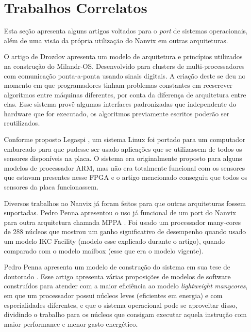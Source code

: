 \section{Trabalhos Correlatos}

Esta seção apresenta alguns artigos voltados para o \textit{port} de sistemas operacionais, além de uma visão da própria utilização do Nanvix em outras arquiteturas.

O artigo de Drozdov \cite{Drozdov2015RealTimeOS} apresenta um modelo de arquitetura e princípios utilizados na construção
do Milandr-OS. Desenvolvido para clusters de multi-processadores com comunicação ponta-a-ponta usando sinais digitais. A criação deste se deu no momento em
que programadores tinham problemas constantes em reescrever algoritmos entre máquinas diferentes, por conta da diferença de arquitetura entre elas. Esse sistema
provê algumas interfaces padronizadas que independente do hardware que for executado, os algoritmos previamente escritos poderão ser reutilizados.

Conforme proposto Legaspi \cite{7372829}, um sistema Linux foi portado para um computador embarcado para
que pudesse ser usado aplicações que se utilizassem de todos os sensores disponíveis na placa. O sistema era originalmente proposto para alguns modelos de processador ARM, mas não era totalmente funcional com os sensores que estavam presentes nesse FPGA e o artigo mencionado conseguiu que todos os sensores da placa funcionassem.

Diversos trabalhos no Nanvix já foram feitos para que outras arquiteturas fossem suportadas. Pedro Penna apresentou o uso já funcional de um port do 
Nanvix para outra arquitetura chamada MPPA \cite{PENNA20211}. Foi usado um processador many-cores de 288 núcleos que mostrou um ganho significativo de desempenho quando usado um 
modelo IKC Facility (modelo esse explicado durante o artigo), quando comparado com o modelo mailbox (esse que era o modelo vigente).

Pedro Penna apresenta um modelo de construção do sistema em sua tese de doutorado \cite{penna:tel-03545212}. Esse artigo apresenta várias proposições 
de modelos de software construídos para atender com a maior eficiência ao modelo \emph{lightweight manycores}, em que um processador possui núcleos leves (eficientes em energia) e com especialidades diferentes, e que o sistema operacional pode se aproveitar disso, dividindo o trabalho para os núcleos que consigam executar aquela instrução com maior performance e menor gasto energético.

